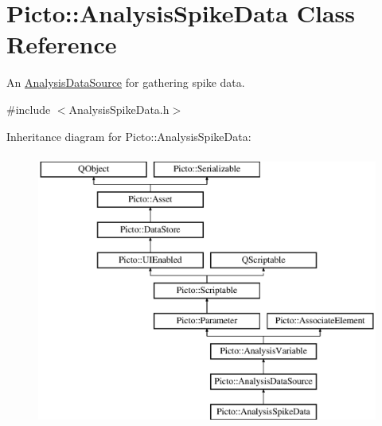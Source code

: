 \hypertarget{class_picto_1_1_analysis_spike_data}{\section{Picto\-:\-:Analysis\-Spike\-Data Class Reference}
\label{class_picto_1_1_analysis_spike_data}
}


An \hyperlink{class_picto_1_1_analysis_data_source}{Analysis\-Data\-Source} for gathering spike data.  




{\ttfamily \#include $<$Analysis\-Spike\-Data.\-h$>$}

Inheritance diagram for Picto\-:\-:Analysis\-Spike\-Data\-:\begin{figure}[H]
\begin{center}
\leavevmode
\includegraphics[height=9.000000cm]{class_picto_1_1_analysis_spike_data}
\end{center}
\end{figure}
